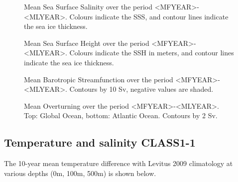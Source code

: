 \documentclass[12pt]{article}
\begin{document}
\begin{figure}[H]
\begin{center}
\caption{Mean Sea Surface Salinity over the period <MFYEAR>-<MLYEAR>. Colours indicate the SSS, and contour lines indicate the sea ice thickness.}
\end{center}
\end{figure}

\begin{figure}[H]
\begin{center}
\caption{Mean Sea Surface Height over the period <MFYEAR>-<MLYEAR>. Colours indicate the SSH in meters, and contour lines indicate the sea ice thickness.}
\end{center}
\end{figure}

\begin{figure}[H]
\begin{center}
\caption{Mean Barotropic Streamfunction over the period <MFYEAR>-<MLYEAR>. Contours by 10 Sv, negative values are shaded.}
\end{center}
\end{figure}

\begin{figure}[H]
\begin{center}
\caption{Mean Overturning over the period <MFYEAR>-<MLYEAR>. Top: Global Ocean, bottom: Atlantic Ocean. Contours by 2 Sv.}
\end{center}
\end{figure}

\subsection{Temperature and salinity CLASS1-1}

The 10-year mean temperature difference with Levitus 2009 climatology at various depths (0m, 100m, 500m) is shown below.
\end{document}
